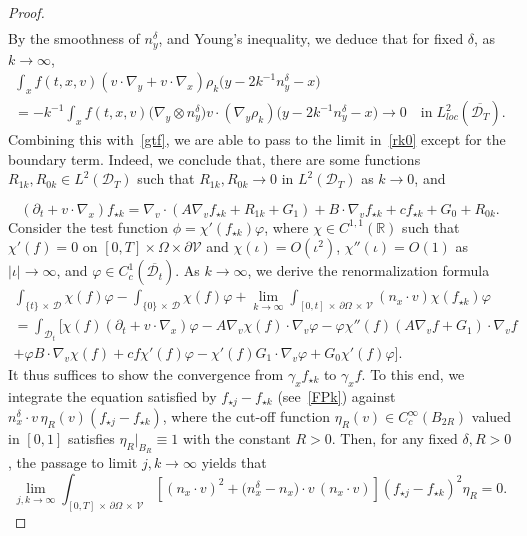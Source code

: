 \documentclass[10pt]{amsart}
\theoremstyle{definition}\newtheorem{defi}[theo]{Definition}\newtheorem{rema}[theo]{Remark}\newtheorem{exam}[theo]{Example}\newtheorem{exem}[theo]{Example}\newtheorem{nota}[theo]{Notation}
\newcommand*\p{\partial}
\newcommand*\R {\mathbb{R}}
\newcommand*\V {\mathcal{V}}
\newcommand*\D {\mathcal{D}}
\begin{document}
\begin{proof}
\begin{multline*}
\end{multline*}
By the smoothness of $n_y^\delta$, and Young's inequality, we deduce that for fixed $\delta$, as $k\rightarrow\infty$,
\begin{multline*}
\int_{x} f(t,x,v) (v\cdot\nabla_y + v\cdot\nabla_x) \rho_k\big(y-2k^{-1}n_y^\delta-x\big)\\
=-k^{-1}\! \int_{x}f(t,x,v) \big(\nabla_y\otimes n_y^\delta\big) v\cdot (\nabla_y\rho_k)\big(y-2k^{-1}n_y^\delta-x\big)\rightarrow0 \quad\text{in}\;L_{loc}^2(\overline{\D_T}).
\end{multline*}
Combining this with~\eqref{gtf}, we are able to pass to the limit in~\eqref{rk0} except for the boundary term. Indeed, we conclude that, there are some functions $R_{1k},R_{0k}\in L^2(\D_T)$ such that $R_{1k},R_{0k}\rightarrow 0$ in $L^2(\D_T)$ as $k\rightarrow0$, and

\begin{equation}\label{FPk}
(\p_t + v\cdot\nabla_x)f_{\star k} = \nabla_v\cdot\left(A\nabla_vf_{\star k}+R_{1k}+ G_1\right) + B\cdot\nabla_vf_{\star k} +cf_{\star k} +G_0 +R_{0k}.
\end{equation}
Consider the test function $\phi=\chi'(f_{\star k})\varphi$, where $\chi\in C^{1,1}(\R)$ such that $\chi'(f)=0$ on $[0,T]\times\Omega\times\p\V$ and $\chi(\iota)=O(\iota^2)$, $\chi''(\iota)=O(1)$ as $|\iota|\rightarrow\infty$, and $\varphi\in C^1_c(\overline{\D_t})$. As $k\rightarrow\infty$, we derive the renormalization formula
\begin{multline}\label{renk}
\int_{\{t\}\,\times\,\D} \chi(f)\varphi -\int_{\{0\}\,\times\,\D}\chi(f)\varphi + \lim_{k\rightarrow\infty}\int_{[0,t]\,\times\,\p\Omega\,\times\,\V} (n_x\cdot v) \chi(f_{\star k})\varphi\\
=\int_{\D_t} \big[\chi(f)(\p_t+v\cdot\nabla_x)\varphi-A\nabla_v\chi(f)\cdot\nabla_v\varphi -\varphi\chi''(f)(A\nabla_vf+G_1)\cdot\nabla_vf\\
+ \varphi B\cdot\nabla_v\chi(f) + cf\chi'(f)\varphi -\chi'(f)G_1\cdot\nabla_v\varphi + G_0\chi'(f)\varphi \big].
\end{multline}
It thus suffices to show the convergence from $\gamma_x f_{\star k}$ to $\gamma_x f$. To this end, we integrate the equation satisfied by $f_{\star j}-f_{\star k}$ (see~\eqref{FPk}) against $n_x^\delta\cdot v\,\eta_R(v)(f_{\star j}-f_{\star k})$, where the cut-off function $\eta_R(v)\in C_c^\infty(B_{2R})$ valued in $[0,1]$ satisfies $\eta_R|_{B_R}\equiv1$ with the constant $R>0$. Then, for any fixed $\delta,R>0$, the passage to limit $j,k\rightarrow\infty$ yields that
\begin{equation}\label{jk}
\lim_{j,k\rightarrow\infty}\int_{[0,T]\,\times\,\p\Omega\,\times\,\V}
\left[(n_x\cdot v)^2 + \big(n_x^\delta-n_x\big)\cdot v\,(n_x\cdot v) \right] \left(f_{\star j}-f_{\star k}\right)^2\eta_R = 0.
\end{equation}


\end{proof}
\end{document}
